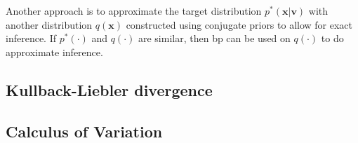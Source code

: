 Another approach is to approximate the target distribution $p^*(\mathbf{x} | \mathbf{v})$ with another distribution $q(\mathbf{x})$ constructed using conjugate priors to allow for exact inference. If $p^*(\cdot)$ and $q(\cdot)$ are similar, then \acrshort{bp} can be used on $q(\cdot)$ to do approximate inference.

\subsection{Kullback-Liebler divergence}

\subsection{Calculus of Variation}